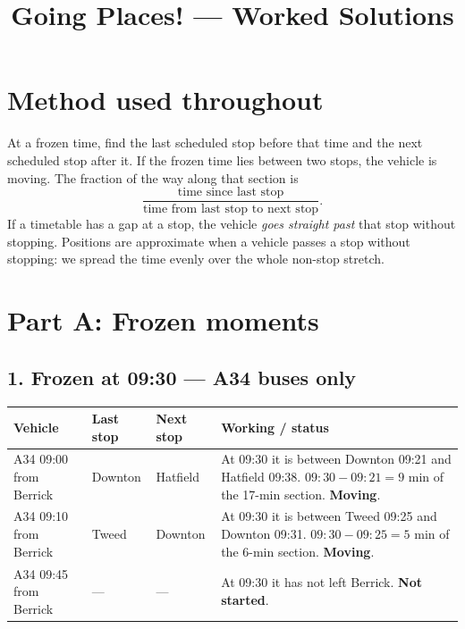\documentclass[11pt,a4paper]{article}
\title{Going Places! --- Worked Solutions}
\date{}
\newcommand{\ans}[1]{\textcolor{red!75!black}{\textbf{#1}}}
\begin{document}
\maketitle

\section*{Method used throughout}
At a frozen time, find the last scheduled stop before that time and the next scheduled stop after it. If the frozen time lies between two stops, the vehicle is moving. The fraction of the way along that section is
\[
\frac{\text{time since last stop}}{\text{time from last stop to next stop}}.
\]
If a timetable has a gap at a stop, the vehicle \emph{goes straight past} that stop without stopping. Positions are approximate when a vehicle passes a stop without stopping: we spread the time evenly over the whole non-stop stretch.

\section*{Part A: Frozen moments}

\subsection*{1. Frozen at 09:30 --- A34 buses only}
\begin{tabularx}{\linewidth}{@{}l l l X@{}}
\toprule
Vehicle & Last stop & Next stop & Working / status\\
\midrule
A34 09:00 from Berrick & Downton & Hatfield & At 09:30 it is between Downton 09:21 and Hatfield 09:38. \(09{:}30-09{:}21=9\) min of the 17-min section. \ans{Moving}.\\
A34 09:10 from Berrick & Tweed & Downton & At 09:30 it is between Tweed 09:25 and Downton 09:31. \(09{:}30-09{:}25=5\) min of the 6-min section. \ans{Moving}.\\
A34 09:45 from Berrick & --- & --- & At 09:30 it has not left Berrick. \ans{Not started}.\\
\bottomrule
\end{tabularx}
\end{document}
